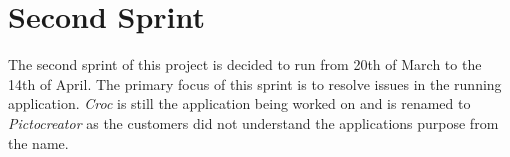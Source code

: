 \chapter{Second Sprint}
The second sprint of this project is decided to run from 20th of March to the 14th of April.
The primary focus of this sprint is to resolve issues in the running application.
\textit{Croc} is still the application being worked on and is renamed to \textit{Pictocreator} as the customers did not understand the applications purpose from the name.




